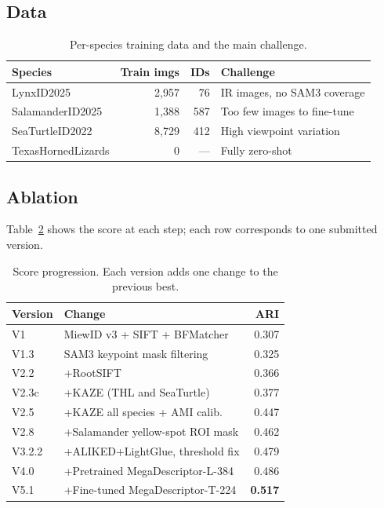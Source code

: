 \documentclass[]{ceurart}
\begin{document}
\subsection{Data}

\begin{table}[h]
  \centering
  \caption{Per-species training data and the main challenge.}
  \label{tab:data}
  \begin{tabular}{lrrl}
    \toprule
    \textbf{Species} & \textbf{Train imgs} & \textbf{IDs} & \textbf{Challenge} \\
    \midrule
    LynxID2025         & 2,957 & 76  & IR images, no SAM3 coverage \\
    SalamanderID2025   & 1,388 & 587 & Too few images to fine-tune \\
    SeaTurtleID2022    & 8,729 & 412 & High viewpoint variation \\
    TexasHornedLizards & 0     & --- & Fully zero-shot \\
    \bottomrule
  \end{tabular}
\end{table}

\subsection{Ablation}

Table~\ref{tab:ablation} shows the score at each step; each row corresponds to
one submitted version.

\begin{table}[h]
  \centering
  \caption{Score progression. Each version adds one change to the previous best.}
  \label{tab:ablation}
  \begin{tabular}{llr}
    \toprule
    \textbf{Version} & \textbf{Change} & \textbf{ARI} \\
    \midrule
    V1     & MiewID v3 + SIFT + BFMatcher     & 0.307 \\
    V1.3   & SAM3 keypoint mask filtering      & 0.325 \\
    V2.2   & +RootSIFT                         & 0.366 \\
    V2.3c  & +KAZE (THL and SeaTurtle)         & 0.377 \\
    V2.5   & +KAZE all species + AMI calib.    & 0.447 \\
    V2.8   & +Salamander yellow-spot ROI mask  & 0.462 \\
    V3.2.2 & +ALIKED+LightGlue, threshold fix  & 0.479 \\
    V4.0   & +Pretrained MegaDescriptor-L-384  & 0.486 \\
    V5.1   & +Fine-tuned MegaDescriptor-T-224  & \textbf{0.517} \\
    \bottomrule
  \end{tabular}
\end{table}
\end{document}
